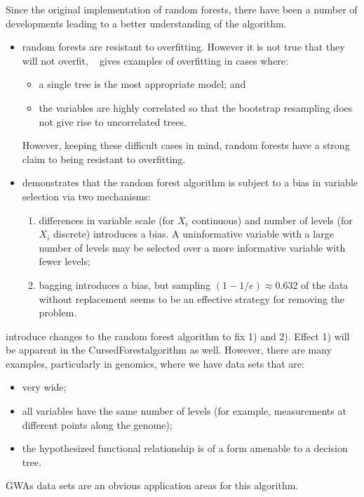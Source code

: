 \documentclass[10pt,letterpaper]{article}
\newcommand{\cursedforest}{{\sc CursedForest}}
\begin{document}
Since the original implementation of random forests, there have been a number of developments leading to a better understanding of
the algorithm. 
\begin{itemize}
\item random forests are resistant to overfitting. However it is not true that they will not overfit,
  ~\cite{Segal.2004} gives examples of overfitting in cases where:
  \begin{itemize}
  \item a single tree is the most appropriate model; and
  \item the variables are highly correlated so that the bootstrap resampling does not give rise to uncorrelated trees.
  \end{itemize}
However, keeping these difficult cases in mind, random forests have a strong claim to being resistant to overfitting.

\item \cite{Strobl.et.al.2007} demonstrates that the random forest algorithm is subject to a bias in variable selection via two mechanisms:
  \begin{enumerate}
  \item differences in variable scale (for $X_i$ continuous) and number of levels (for $X_i$ discrete) introduces a
    bias. A uninformative variable with a large number of levels may be selected over a more informative variable with
    fewer levels;
  \item bagging introduces a bias, but sampling $(1- 1/e) \approx 0.632$ of the data without replacement seems to be an
    effective strategy for removing the problem.
  \end{enumerate}
\end{itemize} 

\cite{Strobl.et.al.2007} introduce changes to the random forest algorithm to fix 1) and 2).  Effect 1) will be
apparent in the \cursedforest algorithm as well.  However, there are many examples, particularly in genomics, where we have data
sets that are:
\begin{itemize}
\item very wide;
\item all variables have the same number of levels (for example, measurements at different points along the genome);
\item the hypothesized functional relationship is of a form amenable to a decision tree.
\end{itemize}
GWAs data sets are an obvious application areas for this algorithm. 
\end{document}
